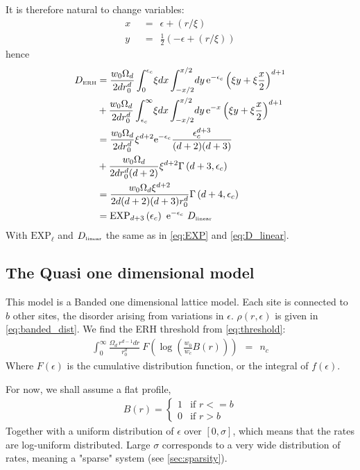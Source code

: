 It is therefore natural to change variables:
%
\begin{align}
x\ \ &= \ \ \epsilon+(r/\xi) \\
y\ \ &= \ \ \frac{1}{2}\left(-\epsilon+(r/\xi)\right) 
\end{align}
%
hence 
%
\begin{align}
D_{\tbox{ERH}} &= 
\frac{w_0\Omega_d}{2dr_0^d}\int_0^{\epsilon_c}\! \xi dx \int_{-x/2}^{x/2} \! dy \, \eexp{-\epsilon_c} \left(\xi y + \xi \frac{x}{2}\right)^{d+1} 
\nonumber \\
& + \frac{w_0\Omega_d}{2dr_0^d}\int_{\epsilon_c}^{\infty} \! \xi dx \int_{-x/2}^{x/2} \! dy \, \eexp{-x} \left(\xi y+\xi \frac{x}{2}\right)^{d+1} 
\nonumber \\
&= \frac{w_0\Omega_d}{2dr_0^d}\xi^{d+2} \eexp{-\epsilon_c} \frac{\epsilon_c^{d+3}}{(d+2)(d+3)}  
\nonumber \\
& +\frac{w_0\Omega_d}{2dr_0^d(d+2)}\xi^{d+2} \Gamma\left(d+3,\epsilon_c\right)
\nonumber \\
&= \frac{w_0\Omega_d \xi^{d+2}}{2d(d+2)(d+3)r_0^d}\Gamma\left(d+4,\epsilon_c\right) \nonumber\\
&=\mathrm{EXP}_{d{+}3}\left(\epsilon_c\right)  \  \eexp{-\epsilon_c}  \ D_{\tbox{linear}}
\end{align}
%
With $\mathrm{EXP}_\ell$ and $D_{\mbox{\tiny linear}}$ the same as in 
\autoref{eq:EXP} and \autoref{eq:D_linear}.




\subsection{The Quasi one dimensional model}

This model is a Banded one dimensional lattice model. Each site 
is connected to $b$ other sites, the disorder arising from
variations in $\epsilon$. $\rho(r,\epsilon)$ is given in \autoref{eq:banded_dist}.
We find the ERH threshold from \autoref{eq:threshold}:
%
\begin{align}\label{eq:thres_banded}
\int_0^{\infty}  
\frac{\Omega_d \, r^{d-1}dr}{r_0^{d}} 
\ F\left(\log\left(\frac{w_0}{w_c}B(r)\right)\right) 
\ \ = \ \ n_c
\end{align}
%
Where $F(\epsilon)$ is the cumulative distribution function, or the integral of $f(\epsilon)$.


For now, we shall assume a flat profile,
%
\begin{align}
B(r) = \begin{cases}
1 & \text{if } r <= b \\
0 & \text{if } r>b
\end{cases}
\end{align}
%
Together with a uniform distribution of $\epsilon$ over $[0,\sigma]$, which means that the rates are log-uniform distributed. Large $\sigma$ corresponds 
to a very wide distribution of rates, meaning a "sparse" system (see 
\autoref{sec:sparsity}).

